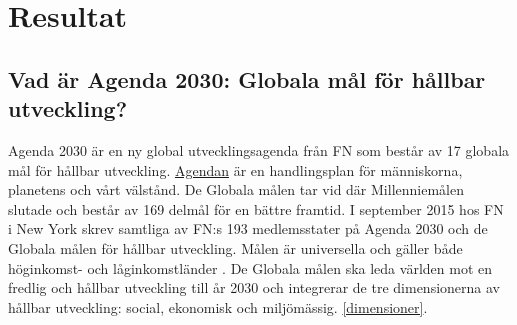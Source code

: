 \documentclass{report}
\begin{document}
\newpage 
\section{Resultat}
\subsection{Vad är Agenda 2030: Globala mål för hållbar utveckling?}
Agenda 2030 är en ny global utvecklingsagenda från FN som består av 17 globala mål för hållbar utveckling. \cite{webUNASweden} \href{https://sustainabledevelopment.un.org/content/documents/21252030%20Agenda%20for%20Sustainable%20Development%20web.pdf}{Agendan} är en handlingsplan för människorna, planetens och vårt välstånd. De Globala målen tar vid där Millenniemålen slutade och består av 169 delmål för en bättre framtid. I september 2015 hos FN i New York skrev samtliga av FN:s 193 medlemsstater på Agenda 2030 och de Globala målen för hållbar utveckling.\cite{webUNASweden} Målen är universella och gäller både höginkomst- och låginkomstländer \cite{webUNDP}. De Globala målen ska leda världen mot en fredlig och hållbar utveckling till år 2030 och integrerar de tre dimensionerna av hållbar utveckling: social, ekonomisk och miljömässig. \ref{dimensioner}. \cite{webUNASweden}\\
\end{document}
